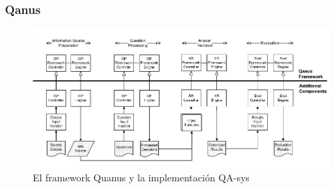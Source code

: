 \begin{frame}
\frametitle{Qanus}
  \begin{figure}
      \includegraphics[scale=0.7]{graficos/Quanus}
    \caption{El framework Quanus y la implementación QA-sys}
    \label{fig:Quanus}
  \end{figure}
\end{frame}


